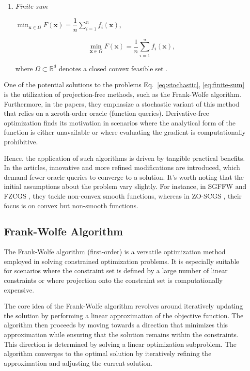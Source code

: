 \begin{multicols}{2}
\begin{enumerate}
    \item \textit{Finite-sum} 
    
    $\min _{\mathbf{x} \in \Omega} F(\mathbf{x})=\dfrac{1}{n} \sum_{i=1}^n f_i(\mathbf{x})$, 
    
    \begin{equation}
        \min _{\mathbf{x} \in \Omega} F(\mathbf{x})=\dfrac{1}{n} \sum_{i=1}^n f_i(\mathbf{x}),
        \label{eq:finite-sum}
    \end{equation}

    where $\Omega \subset \mathbb{R}^d$ denotes a closed convex feasible set \cite{gao20b}.
\end{enumerate}

One of the potential solutions to the problems Eq.~\ref{eq:stochastic}, \ref{eq:finite-sum} 
is the utilization of projection-free methods, such as the Frank-Wolfe algorithm. 
Furthermore, in the papers, they emphasize a stochastic variant of this method that 
relies on a zeroth-order oracle (function queries). Derivative-free optimization finds 
its motivation in scenarios where the analytical form of the function is either 
unavailable or where evaluating the gradient is computationally prohibitive.

Hence, the application of such algorithms is driven by tangible practical benefits. 
In the articles, innovative and more refined modifications are introduced, 
which demand fewer oracle queries to converge to a solution. It's worth noting 
that the initial assumptions about the problem vary slightly. For instance, 
in SGFFW \cite{sahu19a}  and FZCGS \cite{gao20b}, they tackle non-convex smooth
functions, whereas in ZO-SCGS \cite{lobanov2023}, their focus is on convex but non-smooth functions.


\subsection{Frank-Wolfe Algorithm}

The Frank-Wolfe algorithm (first-order) is a versatile optimization method employed in solving 
constrained optimization problems. It is especially suitable for scenarios where 
the constraint set is defined by a large number of linear constraints or 
where projection onto the constraint set is computationally expensive.

The core idea of the Frank-Wolfe algorithm revolves around iteratively 
updating the solution by performing a linear approximation of the objective function. 
The algorithm then proceeds by moving towards a direction that minimizes 
this approximation while ensuring that the solution remains within the constraints. 
This direction is determined by solving a linear optimization subproblem. 
The algorithm converges to the optimal solution by iteratively refining 
the approximation and adjusting the current solution.


\end{multicols}
